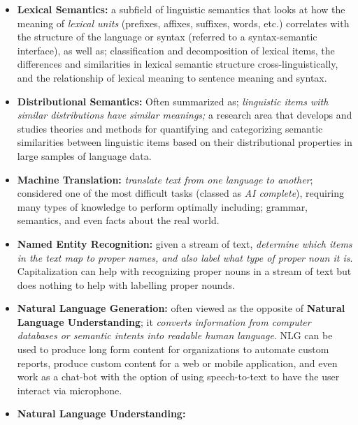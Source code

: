 \documentclass{article}
\newcounter{subsubsubsection}[subsubsection]
\begin{document}
\begin{itemize}
    \item \textbf{Lexical Semantics:} a subfield of linguistic semantics that looks at how the meaning of \textit{lexical units} (prefixes, affixes, suffixes, words, etc.) correlates with the structure of the language or syntax (referred to a syntax-semantic interface), as well as; classification and decomposition of lexical items, the differences and similarities in lexical semantic structure cross-linguistically, and the relationship of lexical meaning to sentence meaning and syntax. \item \textbf{Distributional Semantics:} Often summarized as; \textit{linguistic items with similar distributions have similar meanings;} a research area that develops and studies theories and methods for quantifying and categorizing semantic similarities between linguistic items based on their distributional properties in large samples of language data.
    \item \textbf{Machine Translation:} \textit{translate text from one language to another}; considered one of the most difficult tasks (classed as \textit{AI complete}), requiring many types of knowledge to perform optimally including; grammar, semantics, and even facts about the real world. 
    \item \textbf{Named Entity Recognition:} given a stream of text, \textit{determine which items in the text map to proper names, and also label what type of proper noun it is}. Capitalization can help with recognizing proper nouns in a stream of text but does nothing to help with labelling proper nounds. 
    \item \textbf{Natural Language Generation:} often viewed as the opposite of \textbf{Natural Language Understanding}; it \textit{converts information from computer databases or semantic intents into readable human language}. NLG can be used to produce long form content for organizations to automate custom reports, produce custom content for a web or mobile application, and even work as a chat-bot with the option of using speech-to-text to have the user interact via microphone. 
    \item \textbf{Natural Language Understanding:}
\end{itemize}

\newpage

\newpage 

\newpage 
\end{document}
